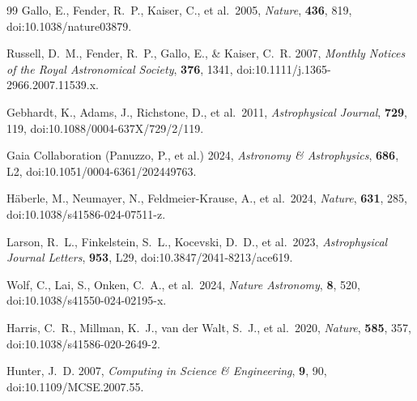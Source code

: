 \documentclass[11pt]{article}
\begin{document}
\begin{thebibliography}{99}
Gallo, E., Fender, R.~P., Kaiser, C., et al.\ 2005,
\emph{Nature}, \textbf{436}, 819,
doi:10.1038/nature03879.

Russell, D.~M., Fender, R.~P., Gallo, E., \& Kaiser, C.~R. 2007,
\emph{Monthly Notices of the Royal Astronomical Society}, \textbf{376}, 1341,
doi:10.1111/j.1365-2966.2007.11539.x.

Gebhardt, K., Adams, J., Richstone, D., et al.\ 2011,
\emph{Astrophysical Journal}, \textbf{729}, 119,
doi:10.1088/0004-637X/729/2/119.

Gaia Collaboration (Panuzzo, P., et al.) 2024,
\emph{Astronomy \& Astrophysics}, \textbf{686}, L2,
doi:10.1051/0004-6361/202449763.

H\"aberle, M., Neumayer, N., Feldmeier-Krause, A., et al.\ 2024,
\emph{Nature}, \textbf{631}, 285,
doi:10.1038/s41586-024-07511-z.

Larson, R.~L., Finkelstein, S.~L., Kocevski, D.~D., et al.\ 2023,
\emph{Astrophysical Journal Letters}, \textbf{953}, L29,
doi:10.3847/2041-8213/ace619.

Wolf, C., Lai, S., Onken, C.~A., et al.\ 2024,
\emph{Nature Astronomy}, \textbf{8}, 520,
doi:10.1038/s41550-024-02195-x.

Harris, C.~R., Millman, K.~J., van der Walt, S.~J., et al.\ 2020,
\emph{Nature}, \textbf{585}, 357,
doi:10.1038/s41586-020-2649-2.

Hunter, J.~D. 2007,
\emph{Computing in Science \& Engineering}, \textbf{9}, 90,
doi:10.1109/MCSE.2007.55.

\end{thebibliography}
\end{document}
